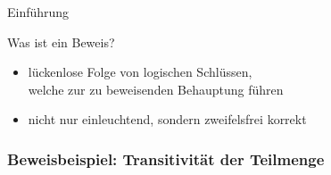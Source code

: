 \begin{frame}{Einführung}
\begin{alertblock}{Was ist ein Beweis?}
\begin{itemize}
        \item lückenlose Folge von logischen Schlüssen,\\welche zur zu beweisenden Behauptung führen
        \item nicht nur einleuchtend, sondern zweifelsfrei korrekt
    \end{itemize}
\end{alertblock}
\end{frame}

\subsubsection{Beweisbeispiel: Transitivität der Teilmenge}
